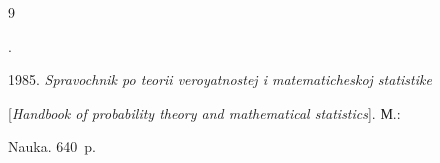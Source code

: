 {{\begin{thebibliography}{9}
 \label{end\stat}


 




. 


1985. \textit{Spravochnik po teorii veroyatnostej i matematicheskoj statistike} 


[\textit{Handbook of probability theory and mathematical statistics}]. М.: 


Nauka. 640~p. 


 \end{thebibliography}


} }





\renewcommand{\bibname}{\protect\rmfamily Литература}


